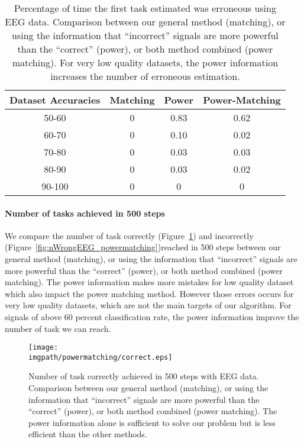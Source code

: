 \begin{table}
\centering
{}
\begin{tabular}{c c c c}
    Dataset Accuracies & Matching & Power & Power-Matching \\ \hline
    50-60 & 0 & 0.83 & 0.62 \\ 
    60-70 & 0 & 0.10 & 0.02 \\
    70-80 & 0 & 0.03 & 0.03 \\
    80-90 & 0 & 0.03 & 0.02 \\
    90-100 & 0 & 0 & 0 \\
\end{tabular}
\caption{Percentage of time the first task estimated was erroneous using EEG data. Comparison between our general method (matching), or using the information that ``incorrect'' signals are more powerful than the ``correct'' (power), or both method combined (power matching). For very low quality datasets, the power information increases the number of erroneous estimation.}
\label{tab:errorTaskRatio}
\end{table}


\paragraph{Number of tasks achieved in 500 steps}

We compare the number of task correctly (Figure~\ref{fig:nCorrect_powermatching}) and incorrectly (Figure~\ref{fig:nWrongEEG_powermatching})reached in 500 steps between our general method (matching), or using the information that ``incorrect'' signals are more powerful than the ``correct'' (power), or both method combined (power matching). The power information makes more mistakes for low quality dataset which also impact the power matching method. However those errors occurs for very low quality datasets, which are not the main targets of our algorithm. For signals of above 60 percent classification rate, the power information improve the number of task we can reach. 

\begin{figure}[!htbp]
\centering
\texttt{[image: \\imgpath/powermatching/correct.eps]}
\caption{Number of task correctly achieved in 500 steps with EEG data. Comparison between our general method (matching), or using the information that ``incorrect'' signals are more powerful than the ``correct'' (power), or both method combined (power matching). The power information alone is sufficient to solve our problem but is less efficient than the other methods.}
\label{fig:nCorrect_powermatching}
\end{figure} 

